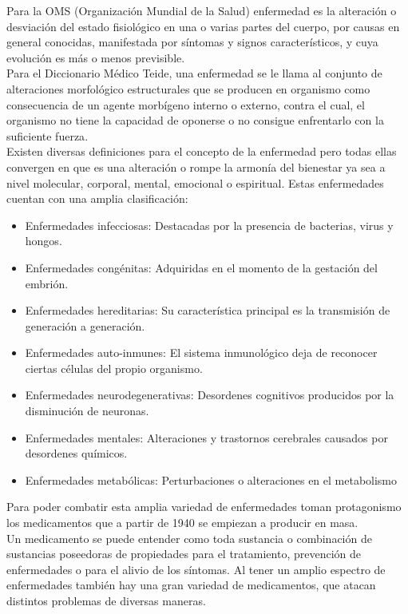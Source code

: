Para la OMS (Organización Mundial de la Salud) enfermedad es la alteración o desviación del estado fisiológico en una o varias partes del cuerpo, por causas en general conocidas, manifestada por síntomas y signos característicos, y cuya evolución es más o menos previsible\cite{Referencia1}.\\
Para el Diccionario Médico Teide, una enfermedad se le llama al conjunto de alteraciones morfológico estructurales que se producen en organismo como consecuencia de un agente morbígeno interno o externo, contra el cual, el organismo no tiene la capacidad de oponerse o no consigue enfrentarlo con la suficiente fuerza\cite{Referencia2}.\\
Existen diversas definiciones para el concepto de la enfermedad pero todas ellas convergen en que es una alteración o rompe la armonía del bienestar ya sea a nivel molecular, corporal, mental, emocional o espiritual.
Estas enfermedades cuentan con una amplia clasificación\cite{Referencia1}:
\begin{itemize}
	\item Enfermedades infecciosas: Destacadas por la presencia de bacterias, virus y hongos.
	\item Enfermedades congénitas: Adquiridas en el momento de la gestación del embrión.
	\item Enfermedades hereditarias: Su característica principal es la transmisión de generación a generación.
	\item Enfermedades auto-inmunes: El sistema inmunológico deja de reconocer ciertas células del propio organismo.
	\item Enfermedades neurodegenerativas: Desordenes cognitivos producidos por la disminución de neuronas.
	\item Enfermedades mentales: Alteraciones y trastornos cerebrales causados por desordenes químicos.
	\item Enfermedades metabólicas: Perturbaciones o alteraciones en el metabolismo
\end{itemize} 
Para poder combatir esta amplia variedad de enfermedades toman protagonismo los medicamentos que a partir de 1940 se empiezan a producir en masa.\\
Un medicamento se puede entender como toda sustancia o combinación de sustancias poseedoras de propiedades para el tratamiento, prevención de enfermedades o para el alivio de los síntomas\cite{Referencia3}.
Al tener un amplio espectro de enfermedades también hay una gran variedad de medicamentos, que atacan distintos problemas de diversas maneras.
